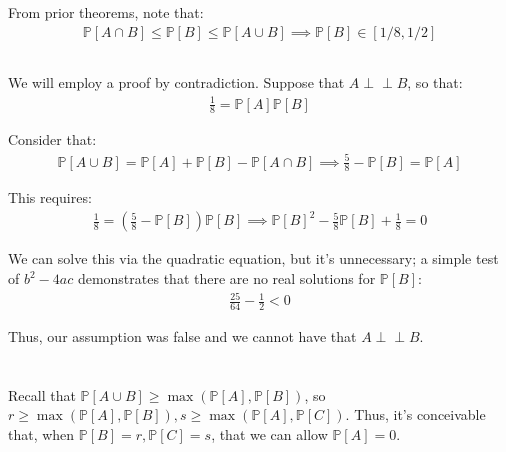 \documentclass{article}
\newcommand{\indep}{\perp \!\!\! \perp}
\begin{document}
\subsection{}
From prior theorems, note that:
\begin{align}
    \mathbb{P}[A \cap B] \leq \mathbb{P}[B] \leq \mathbb{P}[A \cup B] \implies \mathbb{P}[B] \in [1/8, 1/2]
\end{align}

\subsection{}
We will employ a proof by contradiction. Suppose that $A \indep B$, so that:
\begin{align}
    \frac{1}{8} = \mathbb{P}[A] \mathbb{P}[B]
\end{align}

Consider that:
\begin{align}
    \mathbb{P}[A \cup B] = \mathbb{P}[A] + \mathbb{P}[B] - \mathbb{P}[A \cap B] \implies \frac{5}{8} - \mathbb{P}[B]= \mathbb{P}[A]
\end{align}

This requires:
\begin{align}
    \frac{1}{8} = \left( \frac{5}{8} - \mathbb{P}[B] \right) \mathbb{P}[B] \implies \mathbb{P}[B]^2 - \frac{5}{8}\mathbb{P}[B] + \frac{1}{8} = 0
\end{align}

We can solve this via the quadratic equation, but it's unnecessary; a simple test of $b^2 - 4ac$ demonstrates that there are no real solutions for $\mathbb{P}[B]$:
\begin{align}
    \frac{25}{64} - \frac{1}{2} < 0
\end{align}

Thus, our assumption was false and we cannot have that $A \indep B$. 




\newpage %
\section{}
\subsection{}
Recall that $\mathbb{P}[A \cup B] \geq \max(\mathbb{P}[A], \mathbb{P}[B])$, so $r \geq \max(\mathbb{P}[A], \mathbb{P}[B]), s \geq \max(\mathbb{P}[A], \mathbb{P}[C])$. Thus, it's conceivable that, when $\mathbb{P}[B] = r, \mathbb{P}[C] = s$, that we can allow $\mathbb{P}[A] = 0$.
\end{document}
